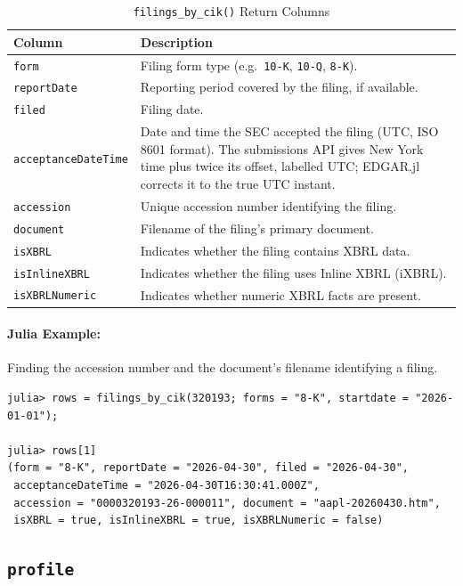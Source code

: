 \documentclass[11pt,a4paper]{report}
\begin{document}
\begin{table}[t]
\centering
\caption{\texttt{filings\_by\_cik()} Return Columns}
\label{tab:filings_by_cik}
\begin{tabular}{@{}p{}p{}@{}}
\toprule
\textbf{Column} & \textbf{Description} \\
\midrule
\texttt{form}               & Filing form type (e.g.\ \texttt{10-K}, \texttt{10-Q}, \texttt{8-K}). \\
\texttt{reportDate}         & Reporting period covered by the filing, if available. \\
\texttt{filed}              & Filing date. \\
\texttt{acceptanceDateTime} & Date and time the SEC accepted the filing (UTC, ISO 8601 format). The submissions API gives New York time plus twice its offset, labelled UTC; EDGAR.jl corrects it to the true UTC instant. \\
\texttt{accession}          & Unique accession number identifying the filing. \\
\texttt{document}           & Filename of the filing’s primary document. \\
\texttt{isXBRL}             & Indicates whether the filing contains XBRL data. \\
\texttt{isInlineXBRL}       & Indicates whether the filing uses Inline XBRL (iXBRL). \\
\texttt{isXBRLNumeric}      & Indicates whether numeric XBRL facts are present. \\
\bottomrule
\end{tabular}
\end{table}

\paragraph{Julia Example:} Finding the accession number and the document's filename identifying a filing.
\begin{lstlisting}
julia> rows = filings_by_cik(320193; forms = "8-K", startdate = "2026-01-01");

julia> rows[1]
(form = "8-K", reportDate = "2026-04-30", filed = "2026-04-30",
 acceptanceDateTime = "2026-04-30T16:30:41.000Z",
 accession = "0000320193-26-000011", document = "aapl-20260430.htm",
 isXBRL = true, isInlineXBRL = true, isXBRLNumeric = false)
\end{lstlisting}

\subsection{\texttt{profile}}
\end{document}
